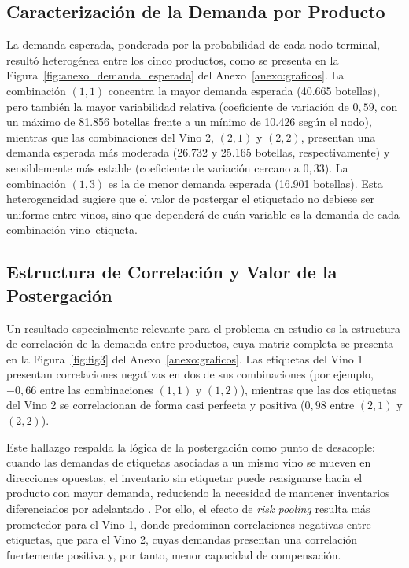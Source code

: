 \subsection{Caracterización de la Demanda por Producto\label{sec:s3}}

La demanda esperada, ponderada por la probabilidad de cada nodo terminal,
resultó heterogénea entre los cinco productos, como se presenta en la
Figura~\ref{fig:anexo_demanda_esperada} del
Anexo~\ref{anexo:graficos}. La combinación $(1,1)$ concentra la mayor demanda
esperada (40.665 botellas), pero también la mayor variabilidad relativa
(coeficiente de variación de $0{,}59$, con un máximo de 81.856 botellas frente
a un mínimo de 10.426 según el nodo), mientras que las combinaciones del
Vino 2, $(2,1)$ y $(2,2)$, presentan una demanda esperada más moderada
(26.732 y 25.165 botellas, respectivamente) y sensiblemente más estable
(coeficiente de variación cercano a $0{,}33$). La combinación $(1,3)$ es la
de menor demanda esperada (16.901 botellas). Esta heterogeneidad sugiere que
el valor de postergar el etiquetado no debiese ser uniforme entre vinos, sino
que dependerá de cuán variable es la demanda de cada combinación
vino--etiqueta.



\subsection{Estructura de Correlación y Valor de la Postergación\label{sec:s4}}

Un resultado especialmente relevante para el problema en estudio es la
estructura de correlación de la demanda entre productos, cuya matriz completa
se presenta en la Figura~\ref{fig:fig3} del Anexo~\ref{anexo:graficos}.
Las etiquetas del Vino 1 presentan correlaciones negativas en dos de sus
combinaciones (por ejemplo, $-0{,}66$ entre las combinaciones $(1,1)$ y
$(1,2)$), mientras que las dos etiquetas del Vino 2 se correlacionan de forma
casi perfecta y positiva ($0{,}98$ entre $(2,1)$ y $(2,2)$).

Este hallazgo respalda la lógica de la postergación como punto de desacople: cuando las demandas de etiquetas asociadas a un mismo vino se mueven en direcciones opuestas, el inventario sin etiquetar puede reasignarse hacia el producto con mayor demanda, reduciendo la necesidad de mantener inventarios diferenciados por adelantado \cite{cholette2018}. Por ello, el efecto de \textit{risk pooling} resulta más prometedor para el Vino 1, donde predominan correlaciones negativas entre etiquetas, que para el Vino 2, cuyas demandas presentan una correlación fuertemente positiva y, por tanto, menor capacidad de compensación.



